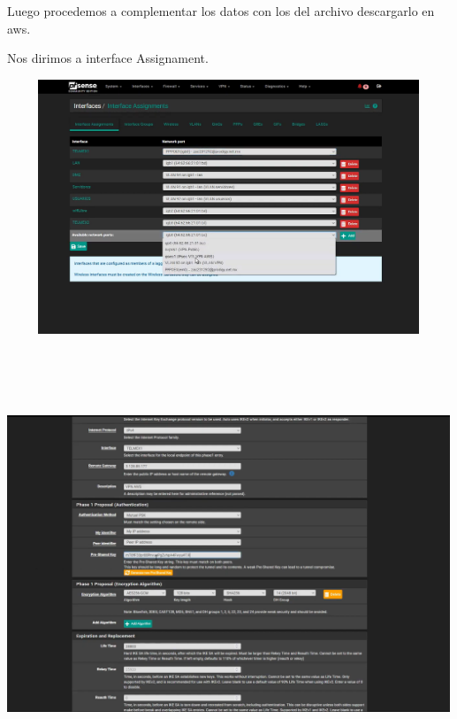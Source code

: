 \documentclass{article} %
\begin{document}
\noindent 

\noindent 

\noindent Luego procedemos a complementar los datos con los del archivo descargarlo en aws. 

\noindent 

\noindent 

\noindent Nos dirimos a interface Assignament. 

\noindent \includegraphics*[width=5.22in, height=2.99in, trim=0.42in 0.78in 0.49in 0.27in]{image39}

\noindent 

\noindent \includegraphics*[width=5.22in, height=5.03in, trim=1.04in 0.00in 1.27in 0.00in]{image40}
\end{document}
